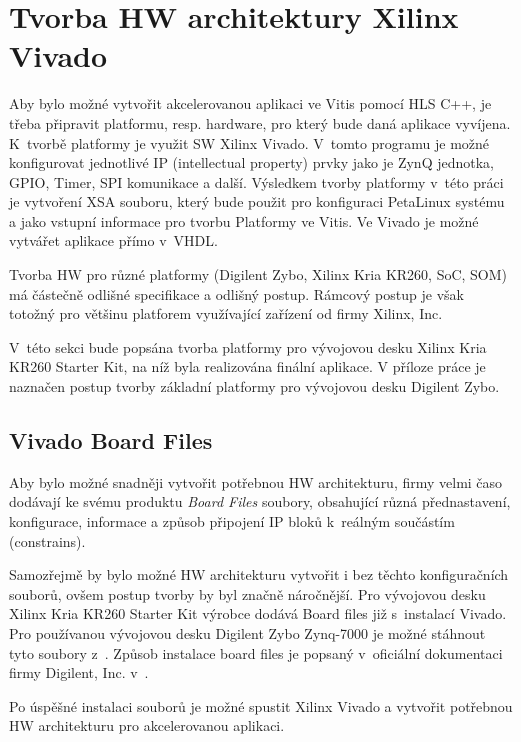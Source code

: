 \documentclass[a4paper, twoside, 11pt]{article}
\begin{document}
	\section{Tvorba HW architektury Xilinx Vivado}
		Aby bylo možné vytvořit akcelerovanou aplikaci ve Vitis pomocí HLS C++, je třeba připravit platformu, resp. hardware, pro který bude daná aplikace vyvíjena. K~tvorbě platformy je využit SW Xilinx Vivado. V~tomto programu je možné konfigurovat jednotlivé IP (intellectual property) prvky jako je ZynQ jednotka, GPIO, Timer, SPI komunikace a další. Výsledkem tvorby platformy v~této práci je vytvoření XSA souboru, který bude použit pro konfiguraci PetaLinux systému a jako vstupní informace pro tvorbu Platformy ve Vitis. Ve Vivado je možné vytvářet aplikace přímo v~VHDL.\par
		Tvorba HW pro různé platformy (Digilent Zybo, Xilinx Kria KR260, SoC, SOM) má částečně odlišné specifikace a odlišný postup. Rámcový postup je však totožný pro většinu platforem využívající zařízení od firmy Xilinx, Inc.\par
		V~této sekci bude popsána tvorba platformy pro vývojovou desku Xilinx Kria KR260 Starter Kit, na níž byla realizována finální aplikace. V příloze práce je naznačen postup tvorby základní platformy pro vývojovou desku Digilent Zybo.\par

		\subsection{Vivado Board Files}\label{subsec:vivado-board-files}
			Aby bylo možné snadněji vytvořit potřebnou HW architekturu, firmy velmi časo dodávají ke svému produktu \textit{Board Files} soubory, obsahující různá přednastavení, konfigurace, informace a způsob připojení IP bloků k~reálným součástím (constrains). \cite{github-vivado-board-files-for-digilent-fpga-boards}\par
			Samozřejmě by bylo možné HW architekturu vytvořit i bez těchto konfiguračních souborů, ovšem postup tvorby by byl značně náročnější. Pro vývojovou desku Xilinx Kria KR260 Starter Kit výrobce dodává Board files již s~instalací Vivado. Pro používanou vývojovou desku Digilent Zybo Zynq-7000 je možné stáhnout tyto soubory z~\cite{github-vivado-board-files-for-digilent-fpga-boards}. Způsob instalace board files je popsaný v~oficiální dokumentaci firmy Digilent, Inc. v~\cite{digilent-installing-vivado-vitis-and-digilent-board-files}.\par
			Po úspěšné instalaci souborů je možné spustit Xilinx Vivado a vytvořit potřebnou HW architekturu pro akcelerovanou aplikaci.\par
			
\end{document}
